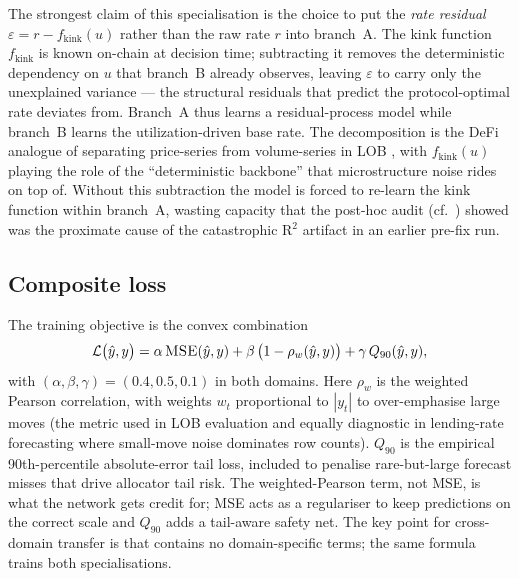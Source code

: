The strongest claim of this specialisation is the choice to put the
\emph{rate residual} $\varepsilon = r - f_{\text{kink}}(u)$ rather than
the raw rate $r$ into branch~A.  The kink function $f_{\text{kink}}$ is
known on-chain at decision time; subtracting it removes the
deterministic dependency on $u$ that branch~B already observes, leaving
$\varepsilon$ to carry only the unexplained variance --- the structural
residuals that \cite{baude2025optimal} predict the protocol-optimal rate
deviates from. Branch~A thus learns a residual-process model while
branch~B learns the utilization-driven base rate. The decomposition is
the DeFi analogue of separating price-series from volume-series in LOB
\cite{solovev2026lob}, with $f_{\text{kink}}(u)$ playing the role of the
``deterministic backbone'' that microstructure noise rides on top of.
Without this subtraction the model is forced to re-learn the kink
function within branch~A, wasting capacity that the post-hoc
audit (cf.\ ) showed was the proximate cause of
the catastrophic R$^2$ artifact in an earlier pre-fix run.

\subsection{Composite loss}
\label{sec:methodology-loss}

The training objective is the convex combination
\begin{equation}
\mathcal{L}\bigl(\hat y, y\bigr)
  = \alpha\,\textsc{MSE}(\hat y, y)
  + \beta\,\bigl(1 - \rho_w(\hat y, y)\bigr)
  + \gamma\,Q_{90}(\hat y, y),
\label{eq:composite-loss}
\end{equation}
with $(\alpha, \beta, \gamma) = (0.4, 0.5, 0.1)$ in both domains.  Here
$\rho_w$ is the weighted Pearson correlation, with weights $w_t$
proportional to $|y_t|$ to over-emphasise large moves (the metric used
in LOB evaluation \cite{solovev2026lob} and equally diagnostic in
lending-rate forecasting where small-move noise dominates row counts).
$Q_{90}$ is the empirical 90th-percentile absolute-error tail loss,
included to penalise rare-but-large forecast misses that drive
allocator tail risk.  The weighted-Pearson term, not MSE, is what the
network gets credit for; MSE acts as a regulariser to keep predictions
on the correct scale and $Q_{90}$ adds a tail-aware safety net.  The
key point for cross-domain transfer is that
 contains no domain-specific terms; the same
formula trains both specialisations.
